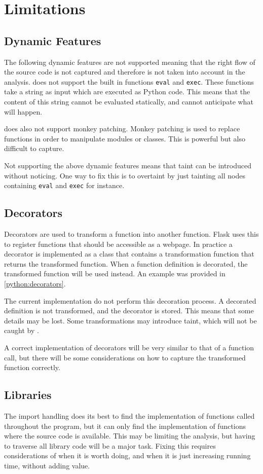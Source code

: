 \section{Limitations}
\subsection{Dynamic Features}
The following dynamic features are not supported meaning that the right flow of the source code is not captured and therefore is not taken into account in the analysis.
\pyt{} does not support the built in functions \texttt{eval} and \texttt{exec}.
These functions take a string as input which are executed as Python code.
This means that the content of this string cannot be evaluated statically, and \pyt{} cannot anticipate what will happen.

\pyt{} does also not support monkey patching.
Monkey patching is used to replace functions in order to manipulate modules or classes.
This is powerful but also difficult to capture.

Not supporting the above dynamic features means that taint can be introduced without \pyt{} noticing.
One way to fix this is to overtaint by just tainting all nodes containing \texttt{eval} and \texttt{exec} for instance.

\subsection{Decorators}
Decorators are used to transform a function into another function.
Flask uses this to register functions that should be accessible as a webpage.
In practice a decorator is implemented as a class that contains a transformation function that returns the transformed function.
When a function definition is decorated, the transformed function will be used instead.
An example was provided in \cref{python:decorators}.

The current implementation do not perform this decoration process.
A decorated definition is not transformed, and the decorator is stored.
This means that some details may be lost.
Some transformations may introduce taint, which will not be caught by \pyt{}.

A correct implementation of decorators will be very similar to that of a function call, but there will be some considerations on how to capture the transformed function correctly.

\subsection{Libraries}
The import handling does its best to find the implementation of functions called throughout the program, but it can only find the implementation of functions where the source code is available.
This may be limiting the analysis, but having to traverse all library code will be a major task.
Fixing this requires considerations of when it is worth doing, and when it is just increasing running time, without adding value.

